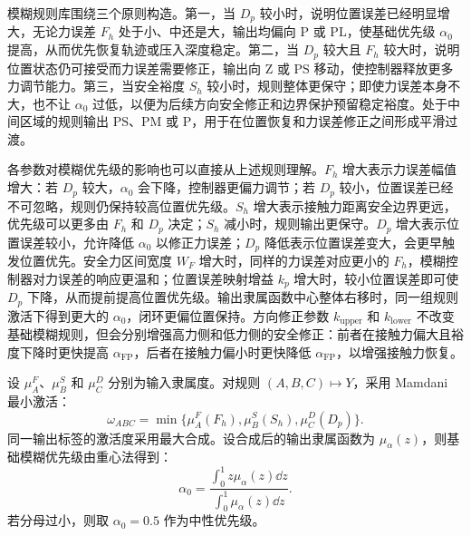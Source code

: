 模糊规则库围绕三个原则构造。第一，当 $D_p$ 较小时，说明位置误差已经明显增大，无论力误差 $F_h$ 处于小、中还是大，输出均偏向 $\mathrm{P}$ 或 $\mathrm{PL}$，使基础优先级 $\alpha_0$ 提高，从而优先恢复轨迹或压入深度稳定。第二，当 $D_p$ 较大且 $F_h$ 较大时，说明位置状态仍可接受而力误差需要修正，输出向 $\mathrm{Z}$ 或 $\mathrm{PS}$ 移动，使控制器释放更多力调节能力。第三，当安全裕度 $S_h$ 较小时，规则整体更保守；即使力误差本身不大，也不让 $\alpha_0$ 过低，以便为后续方向安全修正和边界保护预留稳定裕度。处于中间区域的规则输出 $\mathrm{PS}$、$\mathrm{PM}$ 或 $\mathrm{P}$，用于在位置恢复和力误差修正之间形成平滑过渡。

各参数对模糊优先级的影响也可以直接从上述规则理解。$F_h$ 增大表示力误差幅值增大：若 $D_p$ 较大，$\alpha_0$ 会下降，控制器更偏力调节；若 $D_p$ 较小，位置误差已经不可忽略，规则仍保持较高位置优先级。$S_h$ 增大表示接触力距离安全边界更远，优先级可以更多由 $F_h$ 和 $D_p$ 决定；$S_h$ 减小时，规则输出更保守。$D_p$ 增大表示位置误差较小，允许降低 $\alpha_0$ 以修正力误差；$D_p$ 降低表示位置误差变大，会更早触发位置优先。安全力区间宽度 $W_F$ 增大时，同样的力误差对应更小的 $F_h$，模糊控制器对力误差的响应更温和；位置误差映射增益 $k_p$ 增大时，较小位置误差即可使 $D_p$ 下降，从而提前提高位置优先级。输出隶属函数中心整体右移时，同一组规则激活下得到更大的 $\alpha_0$，闭环更偏位置保持。方向修正参数 $k_{\mathrm{upper}}$ 和 $k_{\mathrm{lower}}$ 不改变基础模糊规则，但会分别增强高力侧和低力侧的安全修正：前者在接触力偏大且裕度下降时更快提高 $\alpha_{\mathrm{FP}}$，后者在接触力偏小时更快降低 $\alpha_{\mathrm{FP}}$，以增强接触力恢复。

设 $\mu_A^F$、$\mu_B^S$ 和 $\mu_C^D$ 分别为输入隶属度。对规则 $(A,B,C)\mapsto Y$，采用 Mamdani 最小激活：
\begin{equation}
  \omega_{ABC}=\min\{\mu_A^F(F_h),\mu_B^S(S_h),\mu_C^D(D_p)\}.
  \label{eq:ch3_fuzzy_activation}
\end{equation}
同一输出标签的激活度采用最大合成。设合成后的输出隶属函数为 $\mu_{\alpha}(z)$，则基础模糊优先级由重心法得到：
\begin{equation}
  \alpha_0=
  \frac{\int_0^1 z\mu_{\alpha}(z)\dd z}
       {\int_0^1 \mu_{\alpha}(z)\dd z}.
  \label{eq:ch3_alpha0}
\end{equation}
若分母过小，则取 $\alpha_0=0.5$ 作为中性优先级。

